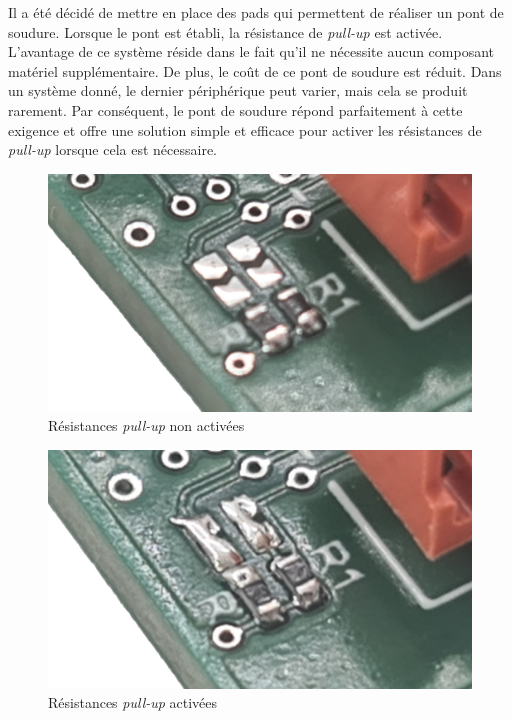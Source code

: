 Il a été décidé de mettre en place des pads qui permettent de réaliser un pont de soudure.
Lorsque le pont est établi, la résistance de \textit{pull-up} est activée.
L'avantage de ce système réside dans le fait qu'il ne nécessite aucun composant matériel supplémentaire.
De plus, le coût de ce pont de soudure est réduit.
Dans un système donné, le dernier périphérique peut varier, mais cela se produit rarement.
Par conséquent, le pont de soudure répond parfaitement à cette exigence et offre une solution simple et efficace pour activer les résistances de \textit{pull-up} lorsque cela est nécessaire.

\begin{figure}[H]
    \centering
    \includegraphics[scale=0.08]{./assets/figures/resistance_desactive.jpg}
    \caption{Résistances \textit{pull-up} non activées}
\end{figure}

\begin{figure}[H]
    \centering
    \includegraphics[scale=0.1]{./assets/figures/resistance_active.jpg}
    \caption{Résistances \textit{pull-up} activées}
\end{figure}

